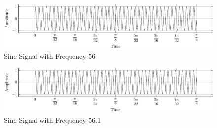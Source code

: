 \documentclass[../../course]{subfiles}
\begin{document}
\begin{figure} [H]
    \centering
     {
        \includegraphics[height = 0.8\textheight] {tikzpics/plotSeqX2.pdf}
    }
     {Sine Signal with Frequency 56}
    \label{plt:seqx2}
\end{figure}

\begin{figure} [H]
    \centering
     {
        \includegraphics[height = 0.8\textheight] {tikzpics/plotSeqX3.pdf}
    }
     {Sine Signal with Frequency 56.1}
    \label{plt:seqx3}
\end{figure}
\end{document}
